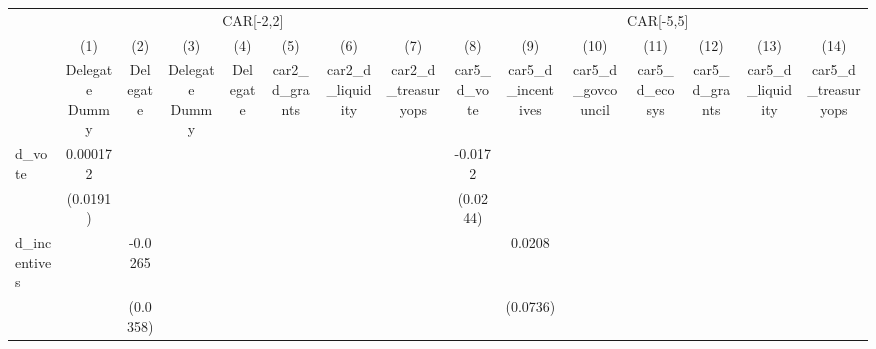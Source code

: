 {
\def\sym#1{\ifmmode^{#1}\else\(^{#1}\)\fi}
\begin{tabular}{l*{14}{c}}
\hline\hline
                    &\multicolumn{7}{c}{CAR[-2,2]}                                                                                                                            &\multicolumn{7}{c}{CAR[-5,5]}                                                                                                                            \\
                    &\multicolumn{1}{c}{(1)}&\multicolumn{1}{c}{(2)}&\multicolumn{1}{c}{(3)}&\multicolumn{1}{c}{(4)}&\multicolumn{1}{c}{(5)}&\multicolumn{1}{c}{(6)}&\multicolumn{1}{c}{(7)}&\multicolumn{1}{c}{(8)}&\multicolumn{1}{c}{(9)}&\multicolumn{1}{c}{(10)}&\multicolumn{1}{c}{(11)}&\multicolumn{1}{c}{(12)}&\multicolumn{1}{c}{(13)}&\multicolumn{1}{c}{(14)}\\
                    &\multicolumn{1}{c}{Delegate Dummy}&\multicolumn{1}{c}{Delegate}&\multicolumn{1}{c}{Delegate Dummy}&\multicolumn{1}{c}{Delegate}&\multicolumn{1}{c}{car2\_d\_grants}&\multicolumn{1}{c}{car2\_d\_liquidity}&\multicolumn{1}{c}{car2\_d\_treasuryops}&\multicolumn{1}{c}{car5\_d\_vote}&\multicolumn{1}{c}{car5\_d\_incentives}&\multicolumn{1}{c}{car5\_d\_govcouncil}&\multicolumn{1}{c}{car5\_d\_ecosys}&\multicolumn{1}{c}{car5\_d\_grants}&\multicolumn{1}{c}{car5\_d\_liquidity}&\multicolumn{1}{c}{car5\_d\_treasuryops}\\
\hline
d\_vote              &    0.000172         &                     &                     &                     &                     &                     &                     &     -0.0172         &                     &                     &                     &                     &                     &                     \\
                    &    (0.0191)         &                     &                     &                     &                     &                     &                     &    (0.0244)         &                     &                     &                     &                     &                     &                     \\
d\_incentives        &                     &     -0.0265         &                     &                     &                     &                     &                     &                     &      0.0208         &                     &                     &                     &                     &                     \\
                    &                     &    (0.0358)         &                     &                     &                     &                     &                     &                     &    (0.0736)         &                     &                     &                     &                     &                     \\

\end{tabular}}

